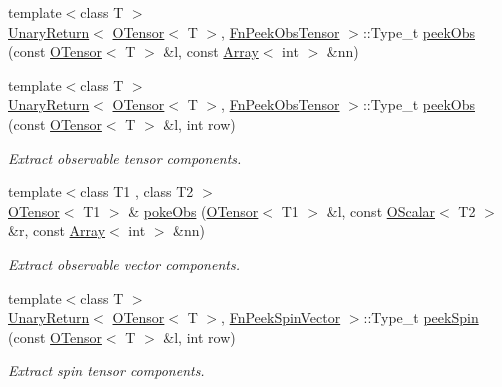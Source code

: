 \begin{DoxyCompactItemize}
\item 
{\footnotesize template$<$class T $>$ }\\\mbox{\hyperlink{structENSEM_1_1UnaryReturn}{Unary\+Return}}$<$ \mbox{\hyperlink{classENSEM_1_1OTensor}{O\+Tensor}}$<$ T $>$, \mbox{\hyperlink{structENSEM_1_1FnPeekObsTensor}{Fn\+Peek\+Obs\+Tensor}} $>$\+::Type\+\_\+t \mbox{\hyperlink{group__obstensor_ga527c1440845b0963c06ccade99d69bf4}{peek\+Obs}} (const \mbox{\hyperlink{classENSEM_1_1OTensor}{O\+Tensor}}$<$ T $>$ \&l, const \mbox{\hyperlink{classXMLArray_1_1Array}{Array}}$<$ int $>$ \&nn)
\item 
{\footnotesize template$<$class T $>$ }\\\mbox{\hyperlink{structENSEM_1_1UnaryReturn}{Unary\+Return}}$<$ \mbox{\hyperlink{classENSEM_1_1OTensor}{O\+Tensor}}$<$ T $>$, \mbox{\hyperlink{structENSEM_1_1FnPeekObsTensor}{Fn\+Peek\+Obs\+Tensor}} $>$\+::Type\+\_\+t \mbox{\hyperlink{group__obstensor_ga9fffee5b1bebf7fa7202b9b11ac11b16}{peek\+Obs}} (const \mbox{\hyperlink{classENSEM_1_1OTensor}{O\+Tensor}}$<$ T $>$ \&l, int row)
\begin{DoxyCompactList}\small\item\em Extract observable tensor components. \end{DoxyCompactList}\item 
{\footnotesize template$<$class T1 , class T2 $>$ }\\\mbox{\hyperlink{classENSEM_1_1OTensor}{O\+Tensor}}$<$ T1 $>$ \& \mbox{\hyperlink{group__obstensor_gaa0e4faa1f2d2fe041ebdf6ba05a05178}{poke\+Obs}} (\mbox{\hyperlink{classENSEM_1_1OTensor}{O\+Tensor}}$<$ T1 $>$ \&l, const \mbox{\hyperlink{classENSEM_1_1OScalar}{O\+Scalar}}$<$ T2 $>$ \&r, const \mbox{\hyperlink{classXMLArray_1_1Array}{Array}}$<$ int $>$ \&nn)
\begin{DoxyCompactList}\small\item\em Extract observable vector components. \end{DoxyCompactList}\item 
{\footnotesize template$<$class T $>$ }\\\mbox{\hyperlink{structENSEM_1_1UnaryReturn}{Unary\+Return}}$<$ \mbox{\hyperlink{classENSEM_1_1OTensor}{O\+Tensor}}$<$ T $>$, \mbox{\hyperlink{structENSEM_1_1FnPeekSpinVector}{Fn\+Peek\+Spin\+Vector}} $>$\+::Type\+\_\+t \mbox{\hyperlink{group__obstensor_gaeee51a2a721122db062ffe8a3e0192c3}{peek\+Spin}} (const \mbox{\hyperlink{classENSEM_1_1OTensor}{O\+Tensor}}$<$ T $>$ \&l, int row)
\begin{DoxyCompactList}\small\item\em Extract spin tensor components. \end{DoxyCompactList}\item 

\end{DoxyCompactItemize}
